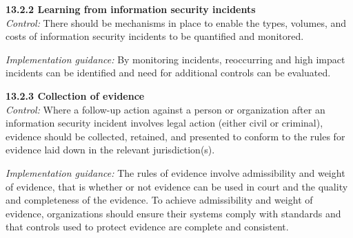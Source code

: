 \textbf{13.2.2 Learning from information security incidents}\\
\emph{Control:} There should be mechanisms in place to enable the types, volumes, and costs of information security incidents to be quantified and monitored.

\emph{Implementation guidance:} By monitoring incidents, reoccurring and high impact incidents can be identified and need for additional controls can be evaluated.

\textbf{13.2.3 Collection of evidence}\\
\emph{Control:} Where a follow-up action against a person or organization after an information security incident involves legal action (either civil or criminal), evidence should be collected, retained, and presented to conform to the rules for evidence laid down in the relevant jurisdiction(s).

\emph{Implementation guidance:} The rules of evidence involve admissibility and weight of evidence, that is whether or not evidence can be used in court and the quality and completeness of the evidence. To achieve admissibility and weight of evidence, organizations should ensure their systems comply with standards and that controls used to protect evidence are complete and consistent.
